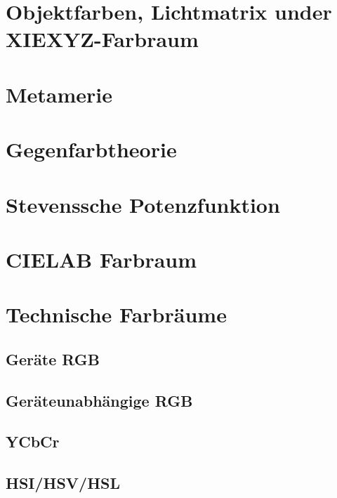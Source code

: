 \documentclass[a4paper, 11pt, accentcolor = tud3b]{tudreport}
\begin{document}
		\section{Objektfarben, Lichtmatrix under XIEXYZ-Farbraum} %

		\section{Metamerie} %

		\section{Gegenfarbtheorie} %

		\section{Stevenssche Potenzfunktion} %

		\section{CIELAB Farbraum} %

		\section{Technische Farbräume} %

			\subsection{Geräte RGB} %

			\subsection{Geräteunabhängige RGB} %

			\subsection{YCbCr} %

			\subsection{HSI/HSV/HSL} %
\end{document}
